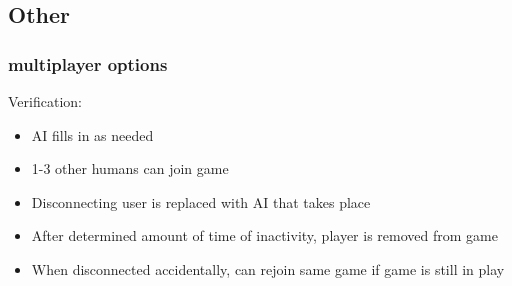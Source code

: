 \documentclass[11pt, titlepage]{article}
\begin{document}
		\subsection{Other}	
			\subsubsection{multiplayer options}
			Verification:
			\begin{itemize}
				\item AI fills in as needed
				\item 1-3 other humans can join game
				\item Disconnecting user is replaced with AI that takes place
				\item After determined amount of time of inactivity, player is removed from game
				\item When disconnected accidentally, can rejoin same game if game is still in play
			\end{itemize}
			
		
\end{document}
